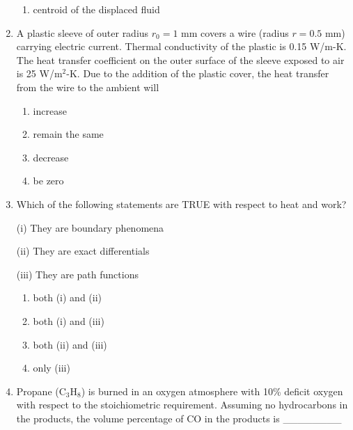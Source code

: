 \documentclass[journal,11pt,onecolumn]{IEEEtran}
\begin{document}
\begin{enumerate}
\begin{enumerate}
              \item centroid of the displaced fluid

          \end{enumerate}

    \item A plastic sleeve of outer radius $r_0 = 1$ mm covers a wire (radius $r = 0.5$ mm) carrying electric current. Thermal conductivity of the plastic is 0.15 W/m-K. The heat transfer coefficient on the outer surface of the sleeve exposed to air is 25 W/m$^2$-K. Due to the addition of the plastic cover, the heat transfer from the wire to the ambient will

          \begin{enumerate}

              \item increase

              \item remain the same

              \item decrease

              \item be zero

          \end{enumerate}

    \item Which of the following statements are TRUE with respect to heat and work?

          (i) They are boundary phenomena

          (ii) They are exact differentials

          (iii) They are path functions

          \begin{enumerate}

              \item both (i) and (ii)

              \item both (i) and (iii)

              \item both (ii) and (iii)

              \item only (iii)

          \end{enumerate}

    \item Propane (C$_3$H$_8$) is burned in an oxygen atmosphere with 10\% deficit oxygen with respect to the stoichiometric requirement. Assuming no hydrocarbons in the products, the volume percentage of CO in the products is \_\_\_\_\_\_\_\_


\end{enumerate}
\end{document}
